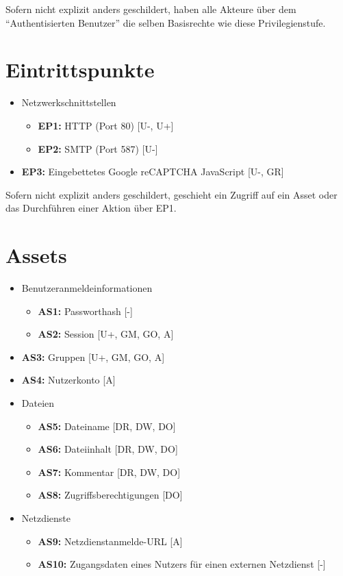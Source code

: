 \documentclass[fontsize=12pt,DIV=14,BCOR=10mm,a4paper,parskip=half-,headsepline,headinclude,english,ngerman,bibliography=totocnumbered]{scrreprt}
\begin{document}
Sofern nicht explizit anders geschildert, haben alle Akteure über dem \enquote{Authentisierten Benutzer} die selben Basisrechte wie diese Privilegienstufe.

\chapter{Eintrittspunkte}

\begin{itemize}
  \item Netzwerkschnittstellen
  \begin{itemize}
    \item \textbf{EP1:} HTTP (Port 80)  [U-, U+]
    \item \textbf{EP2:} SMTP (Port 587) [U-]
  \end{itemize}
  \item \textbf{EP3:} Eingebettetes Google reCAPTCHA JavaScript [U-, GR]
\end{itemize}

Sofern nicht explizit anders geschildert, geschieht ein Zugriff auf ein Asset oder das Durchführen einer Aktion über EP1.

\chapter{Assets}

\begin{itemize}
  \item Benutzeranmeldeinformationen
  \begin{itemize}
    \item \textbf{AS1:} Passworthash [-]
    \item \textbf{AS2:} Session [U+, GM, GO, A]
  \end{itemize}
  \item \textbf{AS3:} Gruppen [U+, GM, GO, A]
  \item \textbf{AS4:} Nutzerkonto [A]
  \item Dateien
  \begin{itemize}
    \item \textbf{AS5:} Dateiname [DR, DW, DO]
    \item \textbf{AS6:} Dateiinhalt [DR, DW, DO]
    \item \textbf{AS7:} Kommentar [DR, DW, DO]
    \item \textbf{AS8:} Zugriffsberechtigungen [DO]
  \end{itemize}
  \item Netzdienste
  \begin{itemize}
    \item \textbf{AS9:} Netzdienstanmelde-URL [A]
    \item \textbf{AS10:} Zugangsdaten eines Nutzers für einen externen Netzdienst [-]
  \end{itemize}
\end{itemize}
\end{document}
